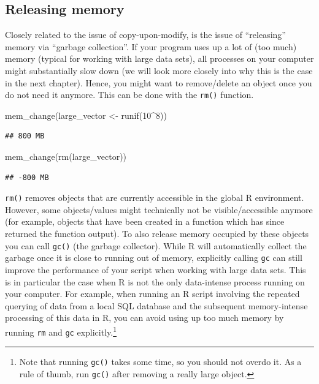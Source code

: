 \documentclass[
  12pt,
]{style/krantz}
\newenvironment{Shaded}{\begin{snugshade}}{\end{snugshade}}
\newcommand{\DecValTok}[1]{\textcolor[rgb]{0.00,0.00,0.81}{#1}}
\newcommand{\FunctionTok}[1]{\textcolor[rgb]{0.00,0.00,0.00}{#1}}
\newcommand{\NormalTok}[1]{#1}
\newcommand{\OtherTok}[1]{\textcolor[rgb]{0.56,0.35,0.01}{#1}}
\newcommand{\SpecialCharTok}[1]{\textcolor[rgb]{0.00,0.00,0.00}{#1}}
\begin{document}
\hypertarget{releasing-memory}{%
\subsection{Releasing memory}\label{releasing-memory}}

Closely related to the issue of copy-upon-modify, is the issue of ``releasing'' memory via ``garbage collection''. If your program uses up a lot of (too much) memory (typical for working with large data sets), all processes on your computer might substantially slow down (we will look more closely into why this is the case in the next chapter). Hence, you might want to remove/delete an object once you do not need it anymore. This can be done with the \texttt{rm()} function.

\begin{Shaded}
\begin{Highlighting}[]
\FunctionTok{mem\_change}\NormalTok{(large\_vector }\OtherTok{\textless{}{-}} \FunctionTok{runif}\NormalTok{(}\DecValTok{10}\SpecialCharTok{\^{}}\DecValTok{8}\NormalTok{))}
\end{Highlighting}
\end{Shaded}

\begin{verbatim}
## 800 MB
\end{verbatim}

\begin{Shaded}
\begin{Highlighting}[]
\FunctionTok{mem\_change}\NormalTok{(}\FunctionTok{rm}\NormalTok{(large\_vector))}
\end{Highlighting}
\end{Shaded}

\begin{verbatim}
## -800 MB
\end{verbatim}

\texttt{rm()} removes objects that are currently accessible in the global R environment. However, some objects/values might technically not be visible/accessible anymore (for example, objects that have been created in a function which has since returned the function output). To also release memory occupied by these objects you can call \texttt{gc()} (the garbage collector). While R will automatically collect the garbage once it is close to running out of memory, explicitly calling \texttt{gc} can still improve the performance of your script when working with large data sets. This is in particular the case when R is not the only data-intense process running on your computer. For example, when running an R script involving the repeated querying of data from a local SQL database and the subsequent memory-intense processing of this data in R, you can avoid using up too much memory by running \texttt{rm} and \texttt{gc} explicitly.\footnote{Note that running \texttt{gc()} takes some time, so you should not overdo it. As a rule of thumb, run \texttt{gc()} after removing a really large object.}
\end{document}
